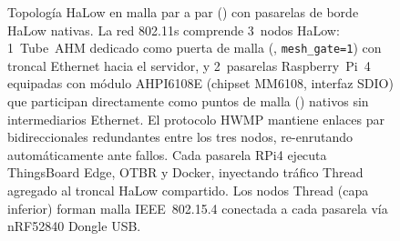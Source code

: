 \begin{figure}[ht]
{%
}%
\caption{Topología HaLow en malla par a par () con pasarelas de borde HaLow nativas.  La red 802.11s comprende 3~nodos HaLow: 1~Tube~AHM dedicado como puerta de malla (, \texttt{mesh\_gate=1}) con troncal Ethernet hacia el servidor, y 2~pasarelas Raspberry~Pi~4 equipadas con módulo AHPI6108E (chipset MM6108, interfaz SDIO) que participan directamente como puntos de malla () nativos sin intermediarios Ethernet.  El protocolo HWMP mantiene enlaces par bidireccionales redundantes entre los tres nodos, re-enrutando automáticamente ante fallos.  Cada pasarela RPi4 ejecuta ThingsBoard Edge, OTBR y Docker, inyectando tráfico Thread agregado al troncal HaLow compartido.  Los nodos Thread (capa inferior) forman malla IEEE~802.15.4 conectada a cada pasarela vía nRF52840 Dongle USB.}
\label{fig:halow-mesh-topology}
\end{figure}
